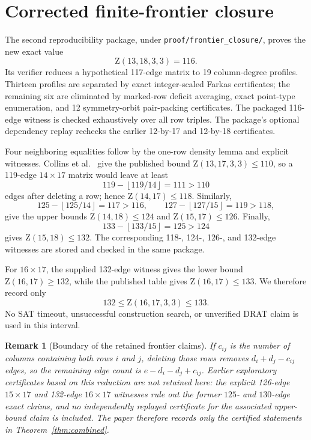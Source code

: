 \documentclass[10pt,a4paper]{amsart}
\newtheorem{remark}[theorem]{Remark}
\newcommand{\Z}{\mathrm Z}
\begin{document}
\section{Corrected finite-frontier closure}
\label{sec:frontier}

The second reproducibility package, under
\texttt{proof/frontier\_closure/}, proves the new exact value
\[
  \Z(13,18,3,3)=116.
\]
Its verifier reduces a hypothetical 117-edge matrix to 19 column-degree
profiles. Thirteen profiles are separated by exact integer-scaled Farkas
certificates; the remaining six are eliminated by marked-row deficit
averaging, exact point-type enumeration, and 12 symmetry-orbit pair-packing
certificates. The packaged 116-edge witness is checked exhaustively over all
row triples. The package's optional dependency replay rechecks the earlier
12-by-17 and 12-by-18 certificates.

Four neighboring equalities follow by the one-row density lemma and explicit
witnesses. Collins et al.~\cite{CollinsRiasanovskyWallaceRadziszowski2016}
give the published bound $\Z(13,17,3,3)\le110$, so a 119-edge $14\times17$
matrix would leave at least
\[
119-\left\lfloor119/14\right\rfloor=111>110
\]
edges after deleting a row; hence $\Z(14,17)\le118$. Similarly,
\[
125-\left\lfloor125/14\right\rfloor=117>116,
\qquad
127-\left\lfloor127/15\right\rfloor=119>118,
\]
give the upper bounds $\Z(14,18)\le124$ and $\Z(15,17)\le126$.
Finally,
\[
133-\left\lfloor133/15\right\rfloor=125>124
\]
gives $\Z(15,18)\le132$. The corresponding 118-, 124-, 126-, and 132-edge
witnesses are stored and checked in the same package.

For $16\times17$, the supplied 132-edge witness gives the lower bound
$\Z(16,17)\ge132$, while the published table gives $\Z(16,17)\le133$.
We therefore record only
\[
  132\le\Z(16,17,3,3)\le133.
\]
No SAT timeout, unsuccessful construction search, or unverified DRAT claim
is used in this interval.

\begin{remark}[Boundary of the retained frontier claims]
If $c_{ij}$ is the number of columns containing both rows $i$ and $j$,
deleting those rows removes $d_i+d_j-c_{ij}$ edges, so the remaining edge
count is $e-d_i-d_j+c_{ij}$. Earlier exploratory certificates based on this
reduction are not retained here: the explicit 126-edge $15\times17$ and
132-edge $16\times17$ witnesses rule out the former $125$- and $130$-edge
exact claims, and no independently replayed certificate for the associated
upper-bound claim is included. The paper therefore records only the certified
statements in Theorem~\ref{thm:combined}.
\end{remark}
\end{document}
